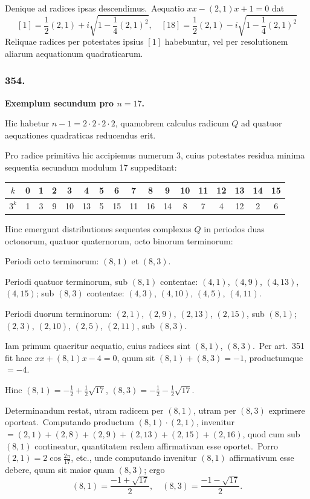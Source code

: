 \documentclass[12pt,a4paper]{article}
\theoremstyle{plain}
\theoremstyle{definition}
\theoremstyle{remark}
\begin{document}
Denique ad radices ipsas descendimus.\ Aequatio $xx-(2,1)x+1=0$
dat
\[[1] = \frac{1}{2}(2,1)+i\sqrt{1-\frac{1}{4}(2,1)^2},\quad [18] = \frac{1}{2}(2,1)-i\sqrt{1-\frac{1}{4}(2,1)^2}\]
Reliquae radices per potestates ipsius $[1]$ habebuntur, vel per resolutionem
aliarum aequationum quadraticarum.

\subsubsection*{354.}

\textbf{Exemplum secundum pro $n=17$.}

Hic habetur $n-1=2\cdot 2\cdot 2\cdot 2$, quamobrem calculus radicum $Q$
ad quatuor aequationes quadraticas reducendus erit.

Pro radice primitiva hic accipiemus numerum 3, cuius potestates
residua minima sequentia secundum modulum 17 suppeditant:

\begin{center}
\begin{tabular}{c|cccccccccccccccc}
$k$ & 0 & 1 & 2 & 3 & 4 & 5 & 6 & 7 & 8 & 9 & 10 & 11 & 12 & 13 & 14 & 15 \\
\hline
$3^k$ & 1 & 3 & 9 & 10 & 13 & 5 & 15 & 11 & 16 & 14 & 8 & 7 & 4 & 12 & 2 & 6
\end{tabular}
\end{center}

Hinc emergunt distributiones sequentes complexus $Q$ in periodos duas
octonorum, quatuor quaternorum, octo binorum terminorum:

Periodi octo terminorum: $(8,1)$ et $(8,3)$.

Periodi quatuor terminorum, sub $(8,1)$ contentae: $(4,1)$, $(4,9)$,
$(4,13)$, $(4,15)$; sub $(8,3)$ contentae: $(4,3)$, $(4,10)$, $(4,5)$,
$(4,11)$.

Periodi duorum terminorum: $(2,1)$, $(2,9)$, $(2,13)$, $(2,15)$, sub
$(8,1)$; $(2,3)$, $(2,10)$, $(2,5)$, $(2,11)$, sub $(8,3)$.

Iam primum quaeritur aequatio, cuius radices sint $(8,1)$, $(8,3)$.\ Per
art.\ 351 fit haec $xx+(8,1)x-4=0$, quum sit $(8,1)+(8,3)=-1$,
productumque $=-4$.

Hinc $(8,1) = -\frac{1}{2}+\frac{1}{2}\sqrt{17}$, $(8,3)=-\frac{1}{2}-\frac{1}{2}\sqrt{17}$.

Determinandum restat, utram radicem per $(8,1)$, utram per $(8,3)$
exprimere oporteat.\ Computando productum $(8,1)\cdot(2,1)$, invenitur
$=(2,1)+(2,8)+(2,9)+(2,13)+(2,15)+(2,16)$, quod cum sub
$(8,1)$ contineatur, quantitatem realem affirmativam esse oportet.\ Porro
$(2,1)=2\cos\frac{2\pi}{17}$, etc., unde computando invenitur $(8,1)$ affirmativum
esse debere, quum sit maior quam $(8,3)$; ergo
\[(8,1) = \frac{-1+\sqrt{17}}{2},\quad (8,3) = \frac{-1-\sqrt{17}}{2}.\]
\end{document}
